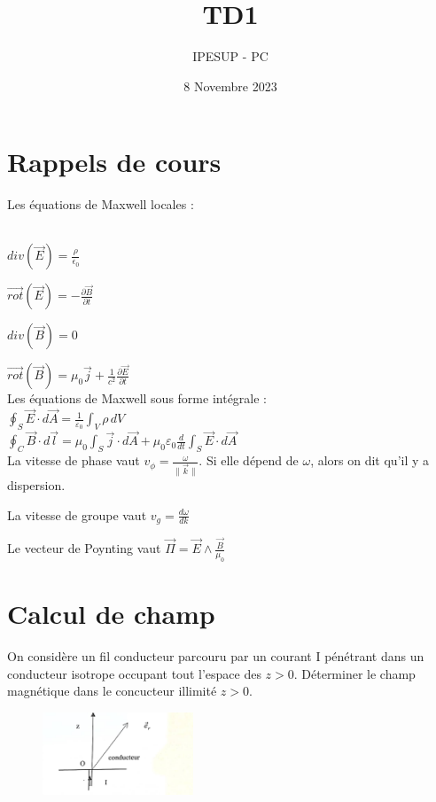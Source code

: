 \documentclass{article}
\title{TD1}
\author{IPESUP - PC }
\date{8 Novembre 2023}
\begin{document}
\maketitle


\section{Rappels de cours}
Les équations de Maxwell locales :\\
\\
\par \(div(\vec{E})=\frac{\rho}{\epsilon_0}\) \\
\par \(\vec{rot}(\vec{E}) = -\frac{\partial\vec{B}}{\partial t}\)\\
\par \(div(\vec{B})=0\) \\
\par \(\vec{rot}(\vec{B}) = \mu_0 \vec{j} + \frac{1}{c^2}\frac{\partial\vec{E}}{\partial t}\)\\

Les équations de Maxwell sous forme intégrale :\\


$\oint_S \vec{E} \cdot d\vec{A} = \frac{1}{\varepsilon_0} \int_V \rho \, dV$\\

$\oint_C \vec{B} \cdot d\vec{l} = \mu_0 \int_S \vec{j} \cdot d\vec{A} + \mu_0\varepsilon_0 \frac{d}{dt}\int_S \vec{E} \cdot d\vec{A}$
\\[0.2cm]

 La vitesse de phase vaut $v_\phi = \frac{\omega}{\lVert\vec{k}\rVert}$. Si elle dépend de $\omega$, alors on dit qu'il y a dispersion. 
 \\[0.2cm]
   \par La vitesse de groupe vaut $v_g=\frac{d\omega}{dk}$\\[0.2cm]
 \par Le vecteur de Poynting vaut $\vec{\Pi} = \vec{E}\wedge \frac{\vec{B}}{\mu_0}$
\section{Calcul de champ}
On considère un fil conducteur parcouru par un courant I pénétrant dans un conducteur isotrope occupant tout l'espace des $z>0$. Déterminer le champ magnétique dans le concucteur illimité $z>0$. 
\begin{figure}[h]
  \centering
  \includegraphics[width=0.4\textwidth]{schéma_conducteur_isotrope.jpg}
  \label{fig:image1}
\end{figure}
\\[1cm]
\end{document}
